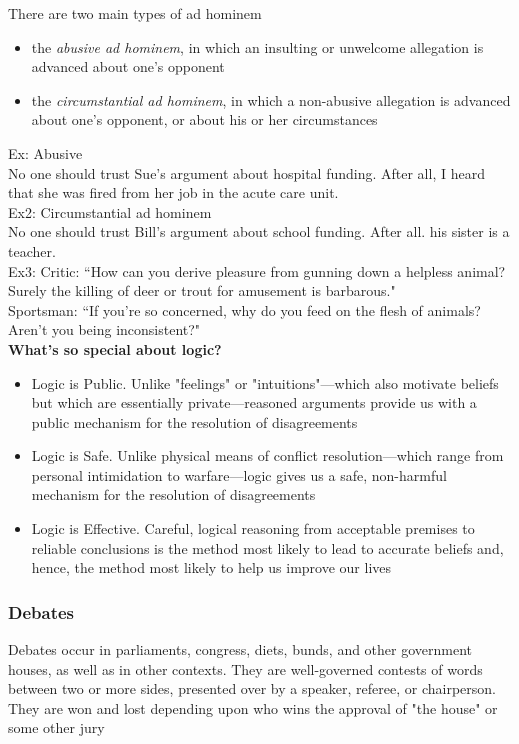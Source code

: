 \documentclass[11pt, fleqn]{article}
\begin{document}
There are two main types of ad hominem
\begin{itemize}
    \item the \textit{abusive ad hominem}, in which an insulting or unwelcome allegation is advanced about one's opponent
    \item the \textit{circumstantial ad hominem}, in which a non-abusive allegation is advanced about one's opponent, or about his or her circumstances
\end{itemize}

Ex: Abusive\\
No one should trust Sue's argument about hospital funding. After all, I heard that she was fired from her job in the acute care unit.\\

Ex2: Circumstantial ad hominem\\
No one should trust Bill's argument about school funding. After all. his sister is a teacher.\\

Ex3: Critic: ``How can you derive pleasure from gunning down a helpless animal? Surely the killing of deer or trout for amusement is barbarous."\\
Sportsman: ``If you're so concerned, why do you feed on the flesh of animals? Aren't you being inconsistent?"\\

\textbf{What's so special about logic?}
\begin{itemize}
    \item Logic is Public. Unlike "feelings" or "intuitions"—which also motivate beliefs but which are essentially private—reasoned arguments provide us with a public mechanism for the resolution of disagreements
    \item Logic is Safe. Unlike physical means of conflict resolution—which range from personal intimidation to warfare—logic gives us a safe, non-harmful mechanism for the resolution of disagreements
    \item Logic is Effective. Careful, logical reasoning from acceptable premises to reliable conclusions is the method most likely to lead to accurate beliefs and, hence, the method most likely to help us improve our lives
\end{itemize}





\subsubsection{Debates}
Debates occur in parliaments, congress, diets, bunds, and other government houses, as well as in other contexts. They are well-governed contests of words between two or more sides, presented over by a speaker, referee, or chairperson. They are won and lost depending upon who wins the approval of "the house" or some other jury\\
\end{document}
